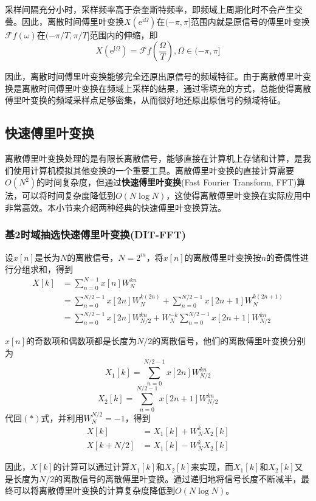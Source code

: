采样间隔充分小时，采样频率高于奈奎斯特频率，即频域上周期化时不会产生交叠。因此，离散时间傅里叶变换$X(\mathrm{e}^{\mathrm{i}\Omega})$在$(-\pi,\pi]$范围内就是原信号的傅里叶变换$\mathcal{F} f(\omega)$在$(-\pi/T,\pi/T]$范围内的伸缩，即
$$X(\mathrm{e}^{\mathrm{i}\Omega})=\mathcal{F} f\left(\frac{\Omega}{T}\right),\Omega\in(-\pi,\pi]$$

因此，离散时间傅里叶变换能够完全还原出原信号的频域特征。由于离散傅里叶变换是离散时间傅里叶变换在频域上采样的结果，通过零填充的方式，总能使得离散傅里叶变换的频域采样点足够密集，从而很好地还原出原信号的频域特征。

\subsection{快速傅里叶变换}\label{sub:FFT}

离散傅里叶变换处理的是有限长离散信号，能够直接在计算机上存储和计算，是我们使用计算机模拟其他变换的一个重要工具。离散傅里叶变换的直接计算需要$O(N^2)$的时间复杂度，但通过\textbf{快速傅里叶变换}(Fast Fourier Transform, FFT)算法，可以将时间复杂度降低到$O(N\log N)$，这使得离散傅里叶变换在实际应用中非常高效。本小节来介绍两种经典的快速傅里叶变换算法。

\subsubsection{基2时域抽选快速傅里叶变换(DIT-FFT)}

设$x[n]$是长为$N$的离散信号，$N=2^m$，将$x[n]$的离散傅里叶变换按$n$的奇偶性进行分组求和，得到
\begin{align*}
X[k]&=\sum_{n=0}^{N-1}x[n]W_N^{kn}\\
&=\sum_{n=0}^{N/2-1}x[2n]W_N^{k(2n)}+\sum_{n=0}^{N/2-1}x[2n+1]W_N^{k(2n+1)}\\
&=\sum_{n=0}^{N/2-1}x[2n]W_{N/2}^{kn}+W_N^{-k}\sum_{n=0}^{N/2-1}x[2n+1]W_{N/2}^{kn}\tag{$*$}
\end{align*}

$x[n]$的奇数项和偶数项都是长度为$N/2$的离散信号，他们的离散傅里叶变换分别为$$X_1[k]=\sum_{n=0}^{N/2-1}x[2n]W_{N/2}^{kn}$$
$$X_2[k]=\sum_{n=0}^{N/2-1}x[2n+1]W_{N/2}^{kn}$$
代回$(*)$式，并利用$W_N^{N/2}=-1$，得到
\begin{align*}
X[k]&=X_1[k]+W_N^{k}X_2[k]\\
X[k+N/2]&=X_1[k]-W_N^{k}X_2[k]
\end{align*}

因此，$X[k]$的计算可以通过计算$X_1[k]$和$X_2[k]$来实现，而$X_1[k]$和$X_2[k]$又是长度为$N/2$的离散信号的离散傅里叶变换。通过递归地将信号长度不断减半，最终可以将离散傅里叶变换的计算复杂度降低到$O(N\log N)$。

